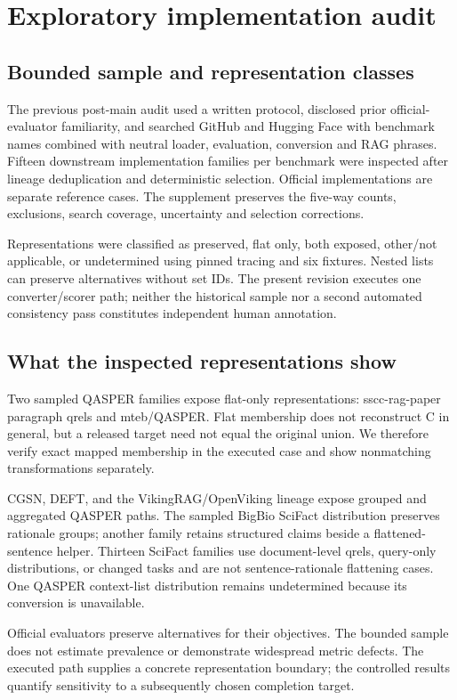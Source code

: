 \documentclass[twoside,a4paper,11pt]{article}
\begin{document}
\section{Exploratory implementation audit}

\subsection{Bounded sample and representation classes}
The previous post-main audit used a written protocol, disclosed prior official-evaluator familiarity, and searched GitHub and Hugging Face with benchmark names combined with neutral loader, evaluation, conversion and RAG phrases. Fifteen downstream implementation families per benchmark were inspected after lineage deduplication and deterministic selection. Official implementations are separate reference cases. The supplement preserves the five-way counts, exclusions, search coverage, uncertainty and selection corrections.

Representations were classified as preserved, flat only, both exposed, other/not applicable, or undetermined using pinned tracing and six fixtures. Nested lists can preserve alternatives without set IDs. The present revision executes one converter/scorer path; neither the historical sample nor a second automated consistency pass constitutes independent human annotation.


\subsection{What the inspected representations show}
Two sampled QASPER families expose flat-only representations: sscc-rag-paper paragraph qrels and mteb/QASPER. Flat membership does not reconstruct C in general, but a released target need not equal the original union. We therefore verify exact mapped membership in the executed case and show nonmatching transformations separately.

CGSN, DEFT, and the VikingRAG/OpenViking lineage expose grouped and aggregated QASPER paths. The sampled BigBio SciFact distribution preserves rationale groups; another family retains structured claims beside a flattened-sentence helper. Thirteen SciFact families use document-level qrels, query-only distributions, or changed tasks and are not sentence-rationale flattening cases. One QASPER context-list distribution remains undetermined because its conversion is unavailable.

Official evaluators preserve alternatives for their objectives. The bounded sample does not estimate prevalence or demonstrate widespread metric defects. The executed path supplies a concrete representation boundary; the controlled results quantify sensitivity to a subsequently chosen completion target.
\end{document}
